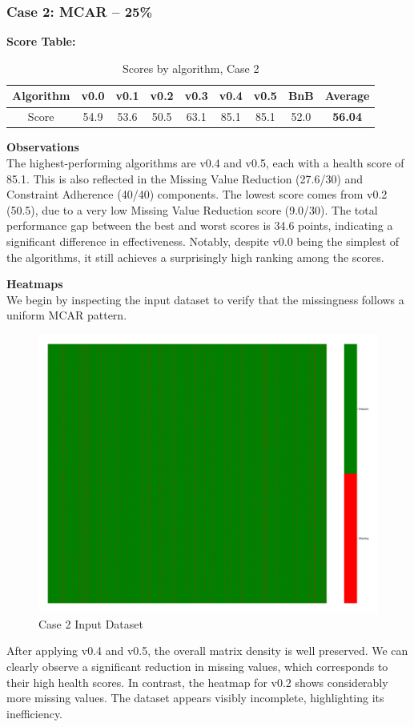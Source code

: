 \documentclass[a4paper,12pt]{article}
\begin{document}
\subsubsection{Case 2: MCAR – 25\%}

\textbf{Score Table:}

\begin{table}[H]
\centering
\caption{Scores by algorithm, Case 2}
\label{tab:score_algorithms_case2_new}
\begin{tabular}{|c|c|c|c|c|c|c|c|c|}
\hline
Algorithm & v0.0 & v0.1 & v0.2 & v0.3 & v0.4 & v0.5 & BnB & Average \\
\hline
Score & 54.9 & 53.6 & 50.5 & 63.1 & 85.1 & 85.1 & 52.0 & \textbf{56.04} \\
\hline
\end{tabular}
\end{table}

\textbf{Observations}\\
The highest-performing algorithms are v0.4 and v0.5, each with a health score of 85.1. This is also reflected in the Missing Value Reduction (27.6/30) and Constraint Adherence (40/40) components. The lowest score comes from v0.2 (50.5), due to a very low Missing Value Reduction score (9.0/30). The total performance gap between the best and worst scores is 34.6 points, indicating a significant difference in effectiveness. Notably, despite v0.0 being the simplest of the algorithms, it still achieves a surprisingly high ranking among the scores.

\textbf{Heatmaps}\\
We begin by inspecting the input dataset to verify that the missingness follows a uniform MCAR pattern.

\begin{figure}[H]
    \centering
    \includegraphics[width=0.5\linewidth]{case2_heatmap_erased.png}
    \caption{Case 2 Input Dataset}
\end{figure}

After applying v0.4 and v0.5, the overall matrix density is well preserved. We can clearly observe a significant reduction in missing values, which corresponds to their high health scores. In contrast, the heatmap for v0.2 shows considerably more missing values. The dataset appears visibly incomplete, highlighting its inefficiency.
\end{document}
